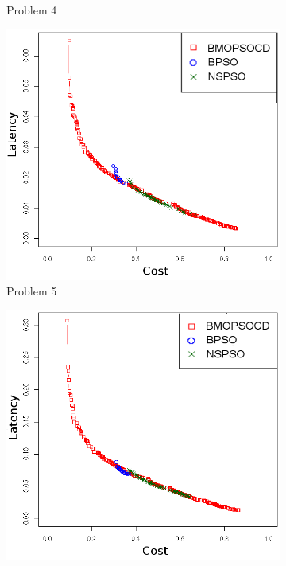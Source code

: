 \begin{figure}[]
\begin{subfigure}{0.30\textwidth}
	   \caption{Problem 4}
   \end{subfigure}
      \begin{subfigure}{0.30\textwidth}
       \includegraphics[width=\textwidth]{pics/total5.png}
	   \caption{Problem 5}
   \end{subfigure}
   \begin{subfigure}{0.30\textwidth}
       \includegraphics[width=\textwidth]{pics/total6.png}

\end{subfigure}
\end{figure}
